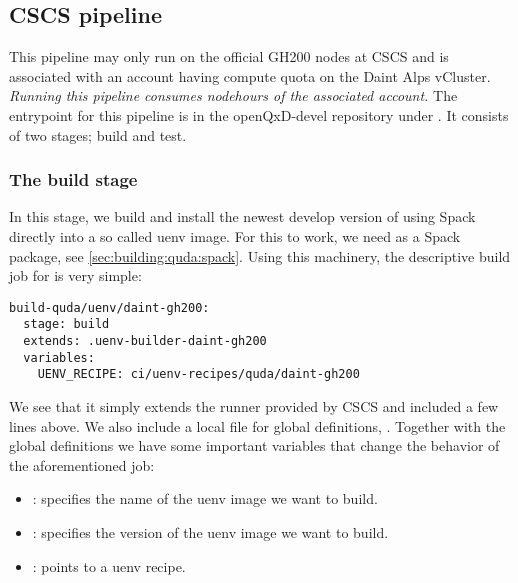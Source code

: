 
\subsection{CSCS pipeline}
\label{sec:cicd:pipeline:cscs}

This pipeline may only run on the official GH200 nodes at CSCS and is associated with an account having compute quota on the Daint Alps vCluster.
\emph{Running this pipeline consumes nodehours of the associated account.}
The entrypoint for this pipeline is in the openQxD-devel repository\cite{gitlab:openqxd-devel} under .
It consists of two stages; build and test.

\subsubsection{The build stage}

In this stage, we build and install the newest develop version of \quda using Spack\cite{Gamblin_The_Spack_Package_2015} directly into a so called uenv\cite{online:cscs:uenv} image.
For this to work, we need \quda as a Spack package, see \cref{sec:building:quda:spack}.
Using this machinery, the descriptive build job for \quda is very simple:
\begin{verbatim}
build-quda/uenv/daint-gh200:
  stage: build
  extends: .uenv-builder-daint-gh200
  variables:
    UENV_RECIPE: ci/uenv-recipes/quda/daint-gh200
\end{verbatim}
We see that it simply extends the runner  provided by CSCS and included a few lines above.
We also include a local file for global definitions, .
Together with the global definitions we have some important variables that change the behavior of the aforementioned job:
\begin{itemize}
  \item {}: specifies the name of the uenv image we want to build.
  \item {}: specifies the version of the uenv image we want to build.
  \item {}: points to a uenv recipe.
\end{itemize}

